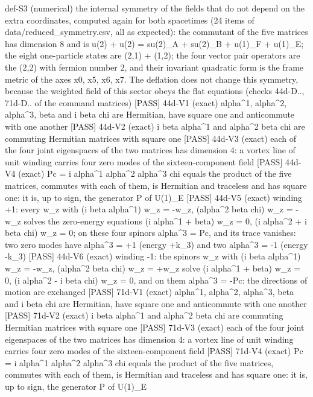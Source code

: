 \documentclass[
  10pt,
]{article}
\newenvironment{Shaded}{}{}
\newcommand{\NormalTok}[1]{#1}
\begin{document}
\begin{Shaded}
\begin{Highlighting}[]
\NormalTok{[PASS] def{-}S3  (numerical) the internal symmetry of the fields that do not depend on the extra coordinates, computed again for both spacetimes (24 items of data/reduced\_symmetry.csv, all as expected): the commutant of the five matrices has dimension 8 and is u(2) + u(2) = su(2)\_A + su(2)\_B + u(1)\_F + u(1)\_E; the eight one{-}particle states are (2,1) + (1,2); the four vector pair operators are the (2,2) with fermion number 2, and their invariant quadratic form is the frame metric of the axes x0, x5, x6, x7. The deflation does not change this symmetry, because the weighted field of this sector obeys the flat equations (checks 44d{-}D.., 71d{-}D.. of the command matrices)}
\NormalTok{[PASS] 44d{-}V1  (exact) alpha\^{}1, alpha\^{}2, alpha\^{}3, beta and i beta chi are Hermitian, have square one and anticommute with one another}
\NormalTok{[PASS] 44d{-}V2  (exact) i beta alpha\^{}1 and alpha\^{}2 beta chi are commuting Hermitian matrices with square one}
\NormalTok{[PASS] 44d{-}V3  (exact) each of the four joint eigenspaces of the two matrices has dimension 4: a vortex line of unit winding carries four zero modes of the sixteen{-}component field}
\NormalTok{[PASS] 44d{-}V4  (exact) Pc = i alpha\^{}1 alpha\^{}2 alpha\^{}3 chi equals the product of the five matrices, commutes with each of them, is Hermitian and traceless and has square one: it is, up to sign, the generator P of U(1)\_E}
\NormalTok{[PASS] 44d{-}V5  (exact) winding +1: every w\_z with (i beta alpha\^{}1) w\_z = {-}w\_z, (alpha\^{}2 beta chi) w\_z = {-}w\_z solves the zero{-}energy equations (i alpha\^{}1 + beta) w\_z = 0, (i alpha\^{}2 + i beta chi) w\_z = 0; on these four spinors alpha\^{}3 = Pc, and its trace vanishes: two zero modes have alpha\^{}3 = +1 (energy +k\_3) and two alpha\^{}3 = {-}1 (energy {-}k\_3)}
\NormalTok{[PASS] 44d{-}V6  (exact) winding {-}1: the spinors w\_z with (i beta alpha\^{}1) w\_z = {-}w\_z, (alpha\^{}2 beta chi) w\_z = +w\_z solve (i alpha\^{}1 + beta) w\_z = 0, (i alpha\^{}2 {-} i beta chi) w\_z = 0, and on them alpha\^{}3 = {-}Pc: the directions of motion are exchanged}
\NormalTok{[PASS] 71d{-}V1  (exact) alpha\^{}1, alpha\^{}2, alpha\^{}3, beta and i beta chi are Hermitian, have square one and anticommute with one another}
\NormalTok{[PASS] 71d{-}V2  (exact) i beta alpha\^{}1 and alpha\^{}2 beta chi are commuting Hermitian matrices with square one}
\NormalTok{[PASS] 71d{-}V3  (exact) each of the four joint eigenspaces of the two matrices has dimension 4: a vortex line of unit winding carries four zero modes of the sixteen{-}component field}
\NormalTok{[PASS] 71d{-}V4  (exact) Pc = i alpha\^{}1 alpha\^{}2 alpha\^{}3 chi equals the product of the five matrices, commutes with each of them, is Hermitian and traceless and has square one: it is, up to sign, the generator P of U(1)\_E}

\end{Highlighting}
\end{Shaded}
\end{document}
